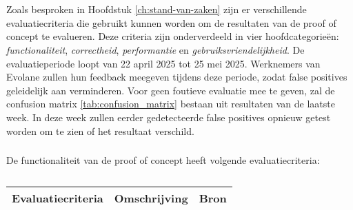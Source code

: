 
\chapter{}%
\label{ch:evaluatie}


\section{}
\label{sec:evaluatie-criteria}

Zoals besproken in Hoofdstuk \ref{ch:stand-van-zaken} zijn er verschillende evaluatiecriteria die gebruikt kunnen worden om de resultaten van de proof of concept te evalueren. 
Deze criteria zijn onderverdeeld in vier hoofdcategorieën: \textit{functionaliteit}, \textit{correctheid}, \textit{performantie} en \textit{gebruiksvriendelijkheid}. 
De evaluatieperiode loopt van 22 april 2025 tot 25 mei 2025. 
Werknemers van Evolane zullen hun feedback meegeven tijdens deze periode, zodat false positives geleidelijk aan verminderen. 
Voor geen foutieve evaluatie mee te geven, zal de confusion matrix \ref{tab:confusion_matrix} bestaan uit resultaten van de laatste week. 
In deze week zullen eerder gedetecteerde false positives opnieuw getest worden om te zien of het resultaat verschild. 


\subsection{}
\label{sec:functionaliteit}

De functionaliteit van de proof of concept heeft volgende evaluatiecriteria:

\begin{table}[h]
    \centering
    \small
    \scriptsize
    \begin{tabular}{p{4cm} p{6cm} p{6cm}}
        \toprule
        \textbf{Evaluatiecriteria} & \textbf{Omschrijving} & \textbf{Bron} \\
        \midrule
        

    \end{tabular}
    \caption{}
    \label{tab:eval-criteria-functionality}
\end{table}

